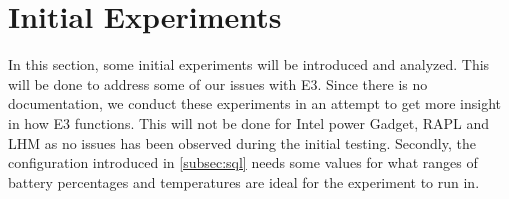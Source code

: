 \section{Initial Experiments}\label{sec:initial_experiments}




In this section, some initial experiments will be introduced and analyzed. This will be done to address some of our issues with E3. Since there is no documentation, we conduct these experiments in an attempt to get more insight in how E3 functions. This will not be done for Intel power Gadget, RAPL and LHM as no issues has been observed during the initial testing. Secondly, the configuration introduced in \cref{subsec:sql} needs some values for what ranges of battery percentages and temperatures are ideal for the experiment to run in.







% 

